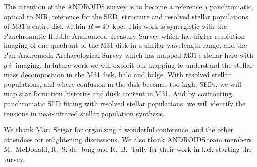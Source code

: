 \documentclass[11pt,twoside]{article}
\begin{document}
The intention of the ANDROIDS survey is to become a reference a panchromatic, optical to NIR, reference for the SED, structure and resolved stellar populations of M31's entire disk within $R=40$~kpc.
This work is synergistic with the Panchromatic Hubble Andromeda Treasury Survey \citep[PHAT;][]{Dalcanton:2012} which has higher-resolution imaging of one quadrant of the M31 disk in a similar wavelength range, and the Pan-Andromeda Archaeological Survey \citep[PAndAS;][]{McConnachie:2009} which has mapped M31's stellar halo with $g^\prime i^\prime$ imaging.
In future work we will exploit our mapping to understand the stellar mass decomposition in the M31 disk, halo and bulge.
With resolved stellar populations, and where confusion in the disk becomes too high, SEDs, we will map star formation histories and dusk content in M31.
And by confronting panchromatic SED fitting with resolved stellar populations, we will identify the tensions in near-infrared stellar population synthesis.

\acknowledgements We thank Marc Seigar for organizing a wonderful conference, and the other attendees for enlightening discussions. We also thank ANDROIDS team members M.~McDonald, R.~S. de~Jong and R.~B.~Tully for their work in kick starting the survey.


\end{document}

